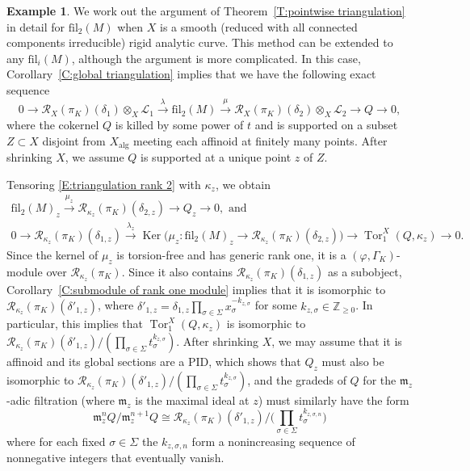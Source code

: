 \documentclass[12pt]{article}
\theoremstyle{definition}
\newtheorem{example}[theorem]{Example}
\numberwithin{equation}{theorem}
\newcommand{\calL}{\mathcal{L}}
\newcommand{\calR}{\mathcal{R}}
\newcommand{\gothm}{\mathfrak{m}}
\newcommand{\ZZ}{\mathbb{Z}}
\newcommand{\alg}{\mathrm{alg}}
\newcommand{\fil}{\mathrm{fil}}
\DeclareMathOperator{\Ker}{Ker}
\DeclareMathOperator{\Tor}{Tor}
\begin{document}
\begin{example}
\label{Ex:main theorem rank 2}
We work out the argument of Theorem~\ref{T:pointwise triangulation} in detail for $\fil_2(M)$ when $X$ is a smooth (reduced with all connected components irreducible) rigid analytic curve.  This method can be extended to any $\fil_i(M)$, although the argument is more complicated.
In this case, Corollary~\ref{C:global triangulation} implies that we have the following exact sequence
\begin{equation}
\label{E:triangulation rank 2}
0 \to \calR_X(\pi_K)(\delta_1) \otimes_X \calL_1 \xrightarrow{\lambda} \fil_2(M) \xrightarrow{\mu} \calR_X(\pi_K)(\delta_2) \otimes_X \calL_2 \to Q \to 0,
\end{equation}
where the cokernel $Q$ is killed by some power of $t$ and is supported on a subset $Z \subset X$ disjoint from $X_\alg$ meeting each affinoid at finitely many points.  After shrinking $X$, we assume $Q$ is supported at a unique point $z$ of $Z$.

Tensoring \eqref{E:triangulation rank 2} with $\kappa_z$, we obtain
\begin{gather}
\label{E:triangulation rank 2-1}
\fil_2(M)_z \xrightarrow{\mu_z} \calR_{\kappa_z}(\pi_K)(\delta_{2,z}) \to Q_z \to 0, \textrm{ and}
\\
\label{E:triangulation rank 2-2}
0 \to \calR_{\kappa_z}(\pi_K)(\delta_{1,z}) \xrightarrow{\lambda_z} \Ker \big(\mu_z: \fil_2(M)_z \to \calR_{\kappa_z}(\pi_K)(\delta_{2,z})\big)
 \to \Tor_1^X(Q, \kappa_z) \to 0.
\end{gather}
Since the kernel of $\mu_z$ is torsion-free and has generic rank one, it is a $(\varphi, \Gamma_K)$-module over $\calR_{\kappa_z}(\pi_K)$.  Since it also contains $\calR_{\kappa_z}(\pi_K)(\delta_{1,z})$ as a subobject, Corollary~\ref{C:submodule of rank one module} implies that it is isomorphic to $\calR_{\kappa_z}(\pi_K)(\delta'_{1,z})$, where $\delta'_{1,z} = \delta_{1,z} \prod_{\sigma \in \Sigma} x_\sigma^{-k_{z,\sigma}}$ for some $k_{z,\sigma} \in \ZZ_{\geq 0}$.
In particular, this implies that  $\Tor_1^X(Q, \kappa_z)$ is isomorphic to $\calR_{\kappa_z}(\pi_K)(\delta'_{1,z}) /( \prod_{\sigma \in \Sigma}t_\sigma^{k_{z,\sigma}})$.  After shrinking $X$, we may assume that it is affinoid and its global sections are a PID, which shows that $Q_z$ must also be isomorphic to $\calR_{\kappa_z}(\pi_K)(\delta'_{1,z})/(\prod_{\sigma\in\Sigma}t_\sigma^{k_{z,\sigma}})$, and the gradeds of $Q$ for the $\gothm_z$-adic filtration (where $\gothm_z$ is the maximal ideal at $z$) must similarly have the form
\[
\gothm_z^nQ/\gothm_z^{n+1}Q \cong \calR_{\kappa_z}(\pi_K)(\delta'_{1,z}) \big/\big( \prod_{\sigma \in \Sigma}t_{\sigma}^{k_{z,\sigma,n}} \big)
\]
where for each fixed $\sigma \in \Sigma$ the $k_{z,\sigma,n}$ form a nonincreasing sequence of nonnegative integers that eventually vanish.


\end{example}
\end{document}
